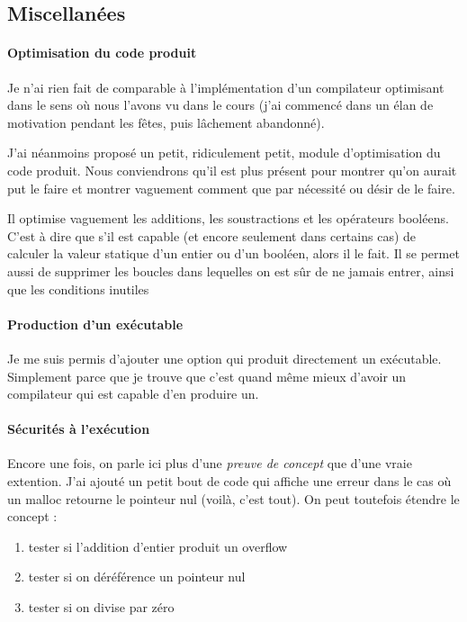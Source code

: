 \documentclass{article}
\begin{document}
\subsection{Miscellanées}

\paragraph{Optimisation du code produit}

Je n'ai rien fait de comparable à l'implémentation d'un compilateur optimisant dans le sens où nous l'avons vu dans le cours (j'ai commencé dans un élan de motivation pendant les fêtes, puis lâchement abandonné).

J'ai néanmoins proposé un petit, ridiculement petit, module d'optimisation du code produit. Nous conviendrons qu'il est plus présent pour montrer qu'on aurait put le faire et montrer vaguement comment que par nécessité ou désir de le faire.

Il optimise vaguement les additions, les soustractions et les opérateurs booléens. C'est à dire que s'il est capable (et encore seulement dans certains cas) de calculer la valeur statique d'un entier ou d'un booléen, alors il le fait. Il se permet aussi de supprimer les boucles dans lequelles on est sûr de ne jamais entrer, ainsi que les conditions inutiles

\paragraph{Production d'un exécutable}

Je me suis permis d'ajouter une option qui produit directement un exécutable. Simplement parce que je trouve que c'est quand même mieux d'avoir un compilateur qui est capable d'en produire un.

\paragraph{Sécurités à l'exécution}

Encore une fois, on parle ici plus d'une \textit{preuve de concept} que d'une vraie extention. J'ai ajouté un petit bout de code qui affiche une erreur dans le cas où un malloc retourne le pointeur nul (voilà, c'est tout). On peut toutefois étendre le concept :

\begin{enumerate}
\item tester si l'addition d'entier produit un overflow
\item tester si on déréférence un pointeur nul
\item tester si on divise par zéro
\end{enumerate}
\end{document}
